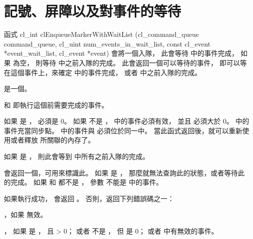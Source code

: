 \section{記號、屏障以及對事件的等待}

函式
\startclc
cl_int clEnqueueMarkerWithWaitList (cl_command_queue command_queue,
				cl_uint num_events_in_wait_list,
				const cl_event *event_wait_list,
				cl_event *event)
\stopclc
會將一個入隊，
此會等待  中的事件完成，
如果  為空，
則等待  中之前入隊的完成。
此會返回一個可以等待的事件，
即可以等在這個事件上，來確定  中的事件完成，
或者  中之前入隊的完成。

 是一個。

 和 
 即執行這個前需要完成的事件。

如果  是 ，
  必須是 0。
如果  不是 ，
  中的事件必須有效，
並且  必須大於 0。
  中的事件充當同步點。
  中的事件與  必須位於同一中。
當此函式返回後，就可以重新使用或者釋放  所關聯的內存了。

如果  是 ，
則此會等到  中所有之前入隊的完成。

 會返回一個，可用來標識此。
如果  是 ，
那麼就無法查詢此的狀態，或者等待此的完成。
如果  和  都不是 ，
參數  不能是  中的事件。

如果執行成功，  會返回 。
否則，返回下列錯誤碼之一：
\startigBase
\item {}，如果  無效。

\item {}，
如果  是 ，
且  > 0；
或者  不是 ，
但  是 0；
或者  中有無效的事件。

